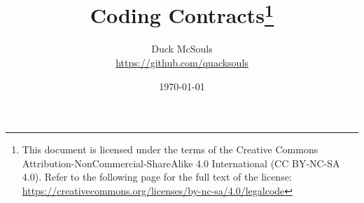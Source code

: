 \documentclass[a4paper,oneside,12pt]{article}
\begin{document}
\title{\Huge\bf Coding Contracts\footnote{
    This document is licensed under the terms of the Creative Commons
    Attribution-NonCommercial-ShareAlike 4.0 International (CC
    BY-NC-SA 4.0).  Refer to the following page for the full text of
    the license:
    \url{https://creativecommons.org/licenses/by-nc-sa/4.0/legalcode}
}}
\author{%
  Duck McSouls \\
  \url{https://github.com/quacksouls}
}
\date{\today}
\maketitle





























\end{document}
